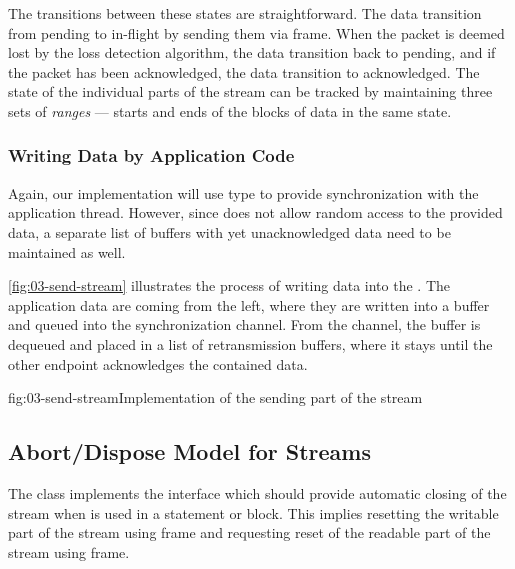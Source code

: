 The transitions between these states are straightforward. The data transition from pending to
in-flight by sending them via \STREAM{} frame. When the packet is deemed lost by the loss detection
algorithm, the data transition back to pending, and if the packet has been acknowledged, the data
transition to acknowledged. The state of the individual parts of the stream can be tracked by
maintaining three sets of \textit{ranges} --- starts and ends of the blocks of data in the same
state.

\subsubsection{Writing Data by Application Code}

Again, our implementation will use \ChannelOf{} type to provide synchronization with the
application thread. However, since \ChannelOf{} does not allow random access to the provided
data, a separate list of buffers with yet unacknowledged data need to be maintained as well.

\autoref{fig:03-send-stream} illustrates the process of writing data into the \SendStream{}. The
application data are coming from the left, where they are written into a buffer and queued into the
synchronization channel. From the channel, the buffer is dequeued and placed in a list of
retransmission buffers, where it stays until the other endpoint acknowledges the contained data.


\begin{myFigure}{fig:03-send-stream}{Implementation of the sending part of the stream}

  \resizebox{\linewidth}{!}{}

\end{myFigure}


\subsection{Abort/Dispose Model for Streams}

The \QuicStream{} class implements the  interface which should provide
automatic closing of the stream when \QuicStream{} is used in a  statement or
 block. This implies resetting the writable part of the stream using \RESETSTREAM{}
frame and requesting reset of the readable part of the stream using \STOPSENDING{} frame.

